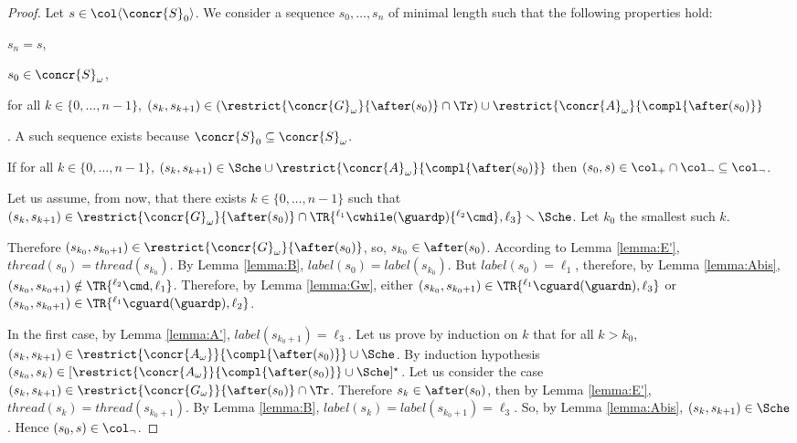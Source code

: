 \documentclass[12pt]{article}
\let\firstunion\cup
\let\firstinter\cap
\let\cup\firstunion
\let\cap\firstinter
\renewcommand{\subset}{\subseteq}
\newcommand{\li}[1]{ {}^{\ell_{#1}}  }
\newcommand{\lbl}{\mathit{label}}
\newcommand{\thread}{\mathit{thread}}
\begin{document}
\begin{proof}
 Let \(s\in\col\langle\concr{S}_0\rangle\).
 We consider a sequence \(s_0,\ldots,s_n\) of minimal length such that the following properties hold:
 \begin{inparaenum}[(1)]
  \item \(s_n=s\), 
  \item \(s_0\in\concr{S}_{\omega}\), 
  \item for all \(k\in\{0,\ldots,n-1\}\), \((s_k,s_{k+1}) \in (\restrict{{\concr{G}_{\omega}}}{\after(s_0)} \cap \Tr)\cup \restrict{{\concr{A}_{\omega}}}{\compl{\after(s_0)}}\)
 \end{inparaenum}. 
A such sequence exists because \(\concr{S}_0\subset\concr{S}_{\omega}\).

If for all \(k\in\{0,\ldots,n-1\}\), \((s_k,s_{k+1})\in\Sche\cup\restrict{{\concr{A}_{\omega}}}{\compl{\after(s_0)}} \) then \((s_0,s)\in\col_{+}\cap \col_{\neg} \subset \col_{\neg}\).

Let us assume, from now, that there exists \(k\in\{0,\ldots,n-1\}\) such that  \((s_k,s_{k+1})\in\restrict{{\concr{G}_{\omega}}}{\after(s_0)} \cap \TR{\li1 \cwhile(\guardp)\{\li2\cmd\},\ell_3}\smallsetminus\Sche\).
Let \(k_0\) the smallest such \(k\).

Therefore \((s_{k_0},s_{k_0+1})\in \restrict{{\concr{G}_{\omega}}}{\after(s_0)}\), so, \(s_{k_{0}}\in\after(s_0)\). According to Lemma \ref{lemma:E'}, \(\thread(s_0)=\thread(s_{k_0})\).
By Lemma \ref{lemma:B}, \(\lbl(s_0)=\lbl(s_{k_0})\).
But \(\lbl(s_0)=\ell_1\), therefore, by Lemma \ref{lemma:Abis}, \((s_{k_0},s_{k_0+1})\notin\TR{\li2\cmd,\ell_1}\).
Therefore, by Lemma \ref{lemma:Gw}, 
either \((s_{k_0},s_{k_0+1})\in\TR{\li1\cguard(\guardn),\ell_3}\) or \((s_{k_0},s_{k_0+1})\in\TR{\li1\cguard(\guardp),\ell_2}\).

In the first case, by Lemma \ref{lemma:A'}, \(\lbl(s_{k_0+1})=\ell_3\). Let us prove by induction on \(k\) that for all \(k>k_0\), \((s_k,s_{k+1})\in \restrict{\concr{A_{\omega}}}{\compl{\after(s_0)}} \cup \Sche\).
By induction hypothesis \((s_{k_0},s_{k})\in[\restrict{\concr{A_{\omega}}}{\compl{\after(s_0)}} \cup \Sche]^{\star}\). Let us consider the case \((s_k,s_{k+1})\in \restrict{\concr{G_{\omega}}}{\after(s_0)}\cap \Tr\). Therefore \(s_k\in\after(s_0)\), then by Lemma \ref{lemma:E'}, \(\thread(s_k)=\thread(s_{k_0+1})\). By Lemma \ref{lemma:B}, \(\lbl(s_k)=\lbl(s_{k_0+1})=\ell_3\). So, by Lemma \ref{lemma:Abis}, \((s_k,s_{k+1})\in\Sche\).
Hence \((s_0,s)\in \col_{\neg}\).


\end{proof}
\end{document}
